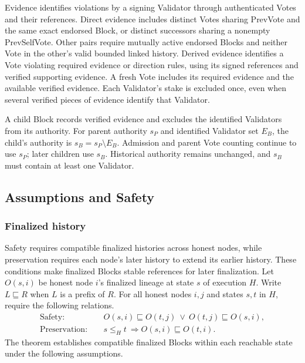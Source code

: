 Evidence identifies violations by a signing Validator through authenticated Votes and their references.
Direct evidence includes distinct Votes sharing PrevVote and the same exact endorsed Block, or distinct successors sharing a nonempty PrevSelfVote.
Other pairs require mutually active endorsed Blocks and neither Vote in the other's valid bounded linked history.
Derived evidence identifies a Vote violating required evidence or direction rules, using its signed references and verified supporting evidence.
A fresh Vote includes its required evidence and the available verified evidence.
Each Validator's stake is excluded once, even when several verified pieces of evidence identify that Validator.

A child Block records verified evidence and excludes the identified Validators from its authority.
For parent authority $s_P$ and identified Validator set $E_B$, the child's authority is $s_B=s_P\setminus E_B$.
Admission and parent Vote counting continue to use $s_P$; later children use $s_B$.
Historical authority remains unchanged, and $s_B$ must contain at least one Validator.

\subsection{Assumptions and Safety}\label{sec:assumptions}

\subsubsection{Finalized history}\label{sec:safety-result}

Safety requires compatible finalized histories across honest nodes, while preservation requires each node's later history to extend its earlier history.
These conditions make finalized Blocks stable references for later finalization.
Let $O(s,i)$ be honest node $i$'s finalized lineage at state $s$ of execution $H$.
Write $L\sqsubseteq R$ when $L$ is a prefix of $R$.
For all honest nodes $i,j$ and states $s,t$ in $H$, require the following relations.
\[
\begin{aligned}
\mathrm{Safety}:\quad
&O(s,i)\sqsubseteq O(t,j)\ \lor\ O(t,j)\sqsubseteq O(s,i),\\
\mathrm{Preservation}:\quad
&s\leq_H t\ \Longrightarrow O(s,i)\sqsubseteq O(t,i).
\end{aligned}
\]
The theorem establishes compatible finalized Blocks within each reachable state under the following assumptions.

